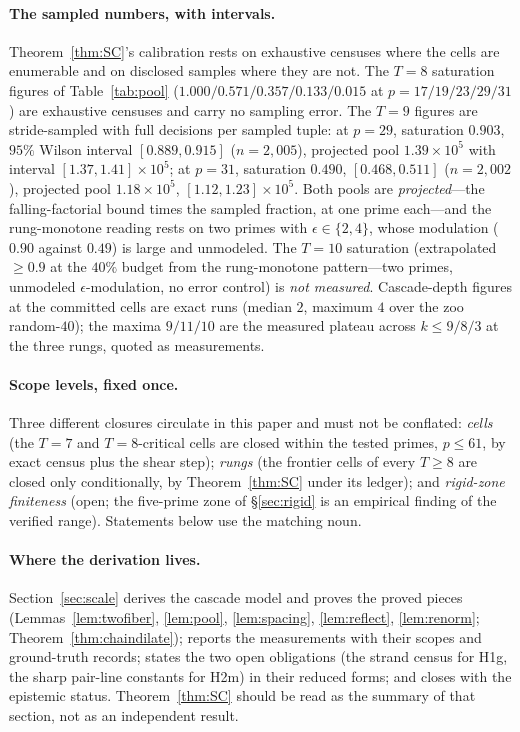 \paragraph{The sampled numbers, with intervals.}
Theorem~\ref{thm:SC}'s calibration rests on exhaustive censuses where
the cells are enumerable and on disclosed samples where they are not.
The $T=8$ saturation figures of Table~\ref{tab:pool}
($1.000/0.571/0.357/0.133/0.015$ at $p=17/19/23/29/31$) are exhaustive
censuses and carry no sampling error. The $T=9$ figures are
stride-sampled with full decisions per sampled tuple: at $p=29$,
saturation $0.903$, $95\%$ Wilson interval $[0.889,0.915]$
($n=2{,}005$), projected pool $1.39\times10^5$ with interval
$[1.37,1.41]\times10^5$; at $p=31$, saturation $0.490$,
$[0.468,0.511]$ ($n=2{,}002$), projected pool $1.18\times10^5$,
$[1.12,1.23]\times10^5$. Both pools are \emph{projected}---the
falling-factorial bound times the sampled fraction, at one prime
each---and the rung-monotone reading rests on two primes with
$\epsilon\in\{2,4\}$, whose modulation ($0.90$ against $0.49$) is large
and unmodeled. The $T=10$ saturation (extrapolated $\ge 0.9$ at the
$40\%$ budget from the rung-monotone pattern---two primes, unmodeled
$\epsilon$-modulation, no error control) is \emph{not measured}. Cascade-depth figures at the
committed cells are exact runs (median $2$, maximum $4$ over the zoo
random-$40$); the maxima $9/11/10$ are the measured plateau across
$k\le 9/8/3$ at the three rungs, quoted as measurements.

\paragraph{Scope levels, fixed once.}
Three different closures circulate in this paper and must not be
conflated: \emph{cells} (the $T=7$ and $T=8$-critical cells are closed
within the tested primes, $p\le 61$, by exact census plus the shear
step); \emph{rungs} (the frontier cells of every $T\ge 8$ are closed
only conditionally, by Theorem~\ref{thm:SC} under its ledger); and
\emph{rigid-zone finiteness} (open; the five-prime zone of
\S\ref{sec:rigid} is an empirical finding of the verified range).
Statements below use the matching noun.

\paragraph{Where the derivation lives.}
Section~\ref{sec:scale} derives the cascade model and proves the proved
pieces (Lemmas~\ref{lem:twofiber}, \ref{lem:pool}, \ref{lem:spacing},
\ref{lem:reflect}, \ref{lem:renorm}; Theorem~\ref{thm:chaindilate});
reports the measurements with their scopes and ground-truth records;
states the two open obligations (the strand census for H1g, the sharp
pair-line constants for H2m) in their reduced forms; and closes with
the epistemic status. Theorem~\ref{thm:SC} should be read as the
summary of that section, not as an independent result.

